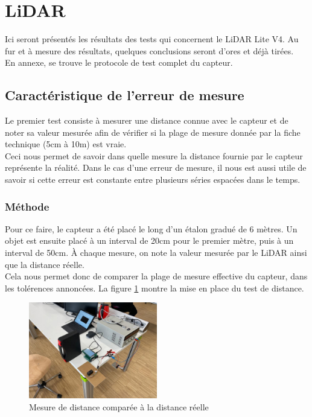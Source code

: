 \section{LiDAR}

Ici seront présentés les résultats des tests qui concernent le LiDAR Lite V4. Au fur et à mesure des
résultats, quelques conclusions seront d'ores et déjà tirées.\\
En annexe, se trouve le protocole de test complet du capteur.

\subsection{Caractéristique de l'erreur de mesure}

Le premier test consiste à mesurer une distance connue avec le capteur et de noter sa valeur mesurée
afin de vérifier si la plage de mesure donnée par la fiche technique (5cm à 10m) est vraie.\\
Ceci nous permet de savoir dans quelle mesure la distance fournie par le capteur représente la réalité.
Dans le cas d'une erreur de mesure, il nous est aussi utile de savoir si cette erreur est constante 
entre plusieurs séries espacées dans le temps.

\subsubsection{Méthode}

Pour ce faire, le capteur a été placé le long d'un étalon gradué de 6 mètres. Un objet est ensuite
placé à un interval de 20cm pour le premier mètre, puis à un interval de 50cm. À chaque mesure, on 
note la valeur mesurée par le LiDAR ainsi que la distance réelle.\\
Cela nous permet donc de comparer la plage de mesure effective du capteur, dans les tolérences
annoncées. La figure \ref{RealDistanceMeasures} montre la mise en place du test de distance.

\begin{figure}[H]
    \centering
    \includegraphics[width=0.5\textwidth]{Images/LiDAR/RealDistanceMes.jpeg}
    \caption{Mesure de distance comparée à la distance réelle}
    \label{RealDistanceMeasures}
\end{figure}


